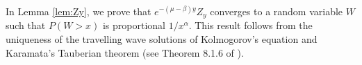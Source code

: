 \documentclass[11pt]{article}
\theoremstyle{plain}
\begin{document}

In Lemma \ref{lem:Zy}, we prove that $e^{-(\mu-\beta)y}Z_y$ converges to a random variable $W$ such that $P(W>x)$ is proportional  $1/x^\alpha$. This result follows from  the uniqueness of the travelling wave solutions of Kolmogorov's equation and Karamata's Tauberian theorem (see Theorem 8.1.6 of \cite{Bingham:1989aa}).
\end{document}
